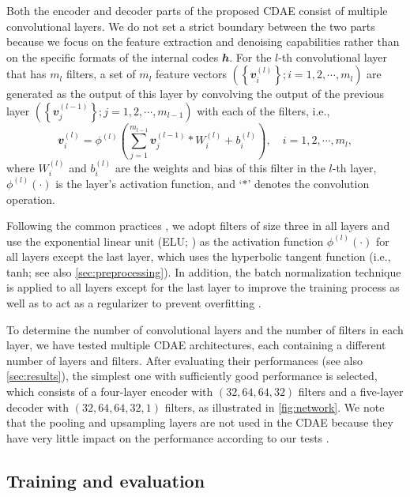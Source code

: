 \documentclass[fleqn,usenatbib]{mnras}
\newcommand{\B}[1]{\mathbfit{#1}}
\begin{document}
Both the encoder and decoder parts of the proposed CDAE consist of multiple
convolutional layers.
We do not set a strict boundary between the two parts
because we focus on the feature extraction and denoising capabilities
rather than on the specific formats of the internal codes $\B{h}$.
For the $l$-th convolutional layer that has $m_l$ filters, a set of $m_l$
feature vectors
$\left(\left\{ \B{v}_{i}^{(l)} \right\}; i = 1, 2, \cdots, m_l \right)$
are generated as the output of this layer by convolving the output of the
previous layer
$\left(\left\{ \B{v}_{j}^{(l-1)} \right\}; j = 1, 2, \cdots, m_{l-1} \right)$
with each of the filters, i.e.,
\begin{equation}
  \label{eq:conv}
  \B{v}_{i}^{(l)} = \phi^{(l)} \left( \sum_{j=1}^{m_{l-1}}
    \B{v}_{j}^{(l-1)} * W_i^{(l)} + b_i^{(l)} \right),
    \quad i = 1, 2, \cdots, m_{l},
\end{equation}
where
$W_i^{(l)}$ and $b_i^{(l)}$ are the weights and bias of this filter
in the $l$-th layer, $\phi^{(l)}(\cdot)$ is the layer's activation
function, and `$*$' denotes the convolution operation.

Following the common practices \citep[e.g.,][]{geron2017,suganuma2018},
we adopt filters of size three in all layers and use the exponential linear
unit (ELU; \citealt{clevert2016}) as the activation function
$\phi^{(l)}(\cdot)$ for all layers except the last layer, which uses
the hyperbolic tangent function (i.e., tanh;
see also \autoref{sec:preprocessing}).
In addition, the batch normalization technique is applied to all layers
except for the last layer to improve the training process as well as to act
as a regularizer to prevent overfitting \citep{ioffe2015}.

To determine the number of convolutional layers and the number of filters
in each layer, we have tested multiple CDAE architectures, each containing
a different number of layers and filters.
After evaluating their performances (see also \autoref{sec:results}),
the simplest one with sufficiently good performance is selected,
which consists of a four-layer encoder with $(32,64,64,32)$ filters and
a five-layer decoder with $(32,64,64,32,1)$ filters, as illustrated in
\autoref{fig:network}.
We note that the pooling and upsampling layers are not used in the CDAE
because they have very little impact on the performance according to our
tests \citep[see also][]{springenberg2015}.


\subsection{Training and evaluation}
\label{sec:train-eval}
\end{document}
